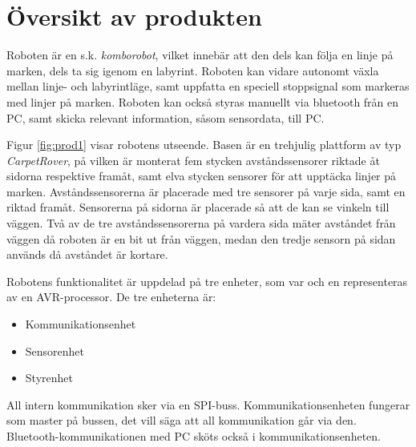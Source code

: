 
%
%
 
\section{Översikt av produkten}

Roboten är en s.k. \emph{komborobot}, vilket innebär att den dels kan följa en 
linje på marken, dels ta sig igenom en labyrint. Roboten kan vidare autonomt 
växla mellan linje- och labyrintläge, samt uppfatta en speciell stoppsignal som
markeras med linjer på marken. Roboten kan också styras manuellt via bluetooth 
från en PC, samt skicka relevant information, såsom sensordata, till PC. 

Figur \ref{fig:prod1} visar robotens utseende. Basen är en trehjulig plattform 
av typ \emph{CarpetRover}, på vilken är monterat fem stycken avståndssensorer 
riktade åt sidorna respektive framåt, samt elva stycken sensorer för att upptäcka 
linjer på marken. Avståndssensorerna är placerade med tre sensorer på varje sida, 
samt en riktad framåt. Sensorerna på sidorna är placerade så att de kan se vinkeln till väggen.
Två av de tre avståndssensorerna på vardera sida mäter avståndet från väggen då roboten
är en bit ut från väggen, medan den tredje sensorn på sidan används då avståndet är
kortare. 


Robotens funktionalitet är uppdelad på tre enheter, som var och en 
representeras av en AVR-processor. De tre enheterna är: 
\begin{itemize}
        \item Kommunikationsenhet
        \item Sensorenhet
        \item Styrenhet
\end{itemize}

All intern kommunikation sker via en SPI-buss. 
Kommunikationsenheten fungerar som master på bussen, det vill säga att all 
kommunikation går via den. Bluetooth-kommunikationen med PC sköts också i 
kommunikationsenheten.
